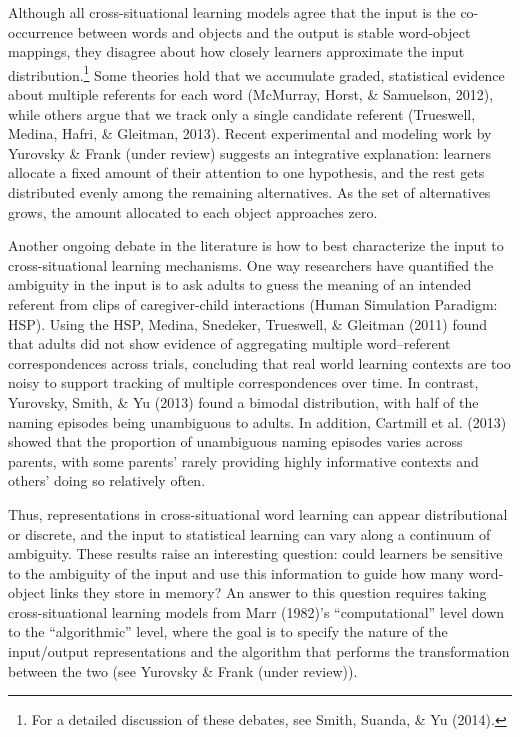\documentclass[12pt,]{article}
\let\rmarkdownfootnote\footnote%
\def\footnote{\protect\rmarkdownfootnote}
\begin{document}
Although all cross-situational learning models agree that the input is
the co-occurrence between words and objects and the output is stable
word-object mappings, they disagree about how closely learners
approximate the input distribution.\footnote{For a detailed discussion
  of these debates, see Smith, Suanda, \& Yu (2014).} Some theories hold
that we accumulate graded, statistical evidence about multiple referents
for each word (McMurray, Horst, \& Samuelson, 2012), while others argue
that we track only a single candidate referent (Trueswell, Medina,
Hafri, \& Gleitman, 2013). Recent experimental and modeling work by
Yurovsky \& Frank (under review) suggests an integrative explanation:
learners allocate a fixed amount of their attention to one hypothesis,
and the rest gets distributed evenly among the remaining alternatives.
As the set of alternatives grows, the amount allocated to each object
approaches zero.

Another ongoing debate in the literature is how to best characterize the
input to cross-situational learning mechanisms. One way researchers have
quantified the ambiguity in the input is to ask adults to guess the
meaning of an intended referent from clips of caregiver-child
interactions (Human Simulation Paradigm: HSP). Using the HSP, Medina,
Snedeker, Trueswell, \& Gleitman (2011) found that adults did not show
evidence of aggregating multiple word--referent correspondences across
trials, concluding that real world learning contexts are too noisy to
support tracking of multiple correspondences over time. In contrast,
Yurovsky, Smith, \& Yu (2013) found a bimodal distribution, with half of
the naming episodes being unambiguous to adults. In addition, Cartmill
et al. (2013) showed that the proportion of unambiguous naming episodes
varies across parents, with some parents' rarely providing highly
informative contexts and others' doing so relatively often.

Thus, representations in cross-situational word learning can appear
distributional or discrete, and the input to statistical learning can
vary along a continuum of ambiguity. These results raise an interesting
question: could learners be sensitive to the ambiguity of the input and
use this information to guide how many word-object links they store in
memory? An answer to this question requires taking cross-situational
learning models from Marr (1982)'s ``computational'' level down to the
``algorithmic'' level, where the goal is to specify the nature of the
input/output representations and the algorithm that performs the
transformation between the two (see Yurovsky \& Frank (under review)).
\end{document}
